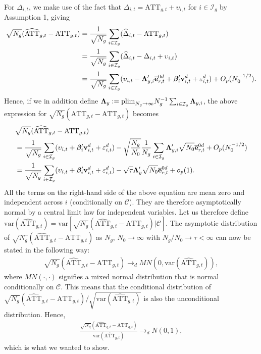 \documentclass[12pt,fleqn]{article}
\begin{document}
For $\Delta_{i,t}$, we make use of the fact that $\Delta_{i,t}= \mathrm{ATT}_{g,t} + \upsilon_{i,t}$ for $i\in \mathcal{I}_g$ by Assumption 1, giving
\begin{align}
 \sqrt{N_g}(\widehat{\mathrm{ATT}}_{g,t} - \mathrm{ATT}_{g,t}) & = \frac{1}{\sqrt{N_g}} \sum_{i\in \mathcal{I}_g} (\widehat \Delta_{i,t} - \mathrm{ATT}_{g,t}) \notag\\
& = \frac{1}{\sqrt{N_g}} \sum_{i\in \mathcal{I}_g} (\widehat \Delta_{i,t} - \Delta_{i,t} + \upsilon_{i,t}) \notag\\
& = \frac{1}{\sqrt{N_g}} \sum_{i\in \mathcal{I}_g} (\upsilon_{i,t} - \boldsymbol{\Lambda}_{y,i}'\overline{\mathbf{e}}_{r,t}^{0d} + \boldsymbol{\beta}_i'\mathbf{v}_{i,t}^d + \varepsilon_{i,t}^d ) + O_p(N_0^{-1/2}) .
\end{align}
Hence, if we in addition define $\boldsymbol{\Lambda}_y := \mathrm{plim}_{N_g\to\infty} N_g^{-1} \sum_{i\in \mathcal{I}_g}\boldsymbol{\Lambda}_{y,i}$, the above expression for $\sqrt{N_g}(\widehat{\mathrm{ATT}}_{g,t} - \mathrm{ATT}_{g,t})$ becomes
\begin{align}
& \sqrt{N_g}(\widehat{\mathrm{ATT}}_{g,t} - \mathrm{ATT}_{g,t}) \notag\\
&= \frac{1}{\sqrt{N_g}}\sum_{i\in \mathcal{I}_g}(\upsilon_{i,t}  + \boldsymbol{\beta}_i'\mathbf{v}_{i,t}^d + \varepsilon_{i,t}^d) - \sqrt{\frac{N_g}{N_0}} \frac{1}{N_g}\sum_{i\in \mathcal{I}_g} \boldsymbol{\Lambda}_{y,i}'\sqrt{N_0}\overline{\mathbf{e}}_{r,t}^{0d} + O_p(N_0^{-1/2}) \notag\\
&= \frac{1}{\sqrt{N_g}}\sum_{i\in \mathcal{I}_g} (\upsilon_{i,t}  + \boldsymbol{\beta}_i'\mathbf{v}_{i,t}^d + \varepsilon_{i,t}^d ) - \sqrt{\tau}\boldsymbol{\Lambda}_y'\sqrt{N_0}\overline{\mathbf{e}}_{r,t}^{0d} + o_p(1).
\end{align}
All the terms on the right-hand side of the above equation are mean zero and independent across $i$ (conditionally on $\mathcal{C}$). They are therefore asymptotically normal by a central limit law for independent variables. Let us therefore define $\mathrm{var}(\widehat{\mathrm{ATT}}_{g,t}) = \mathrm{var}[\sqrt{N_g}(\widehat{\mathrm{ATT}}_{g,t} - \mathrm{ATT}_{g,t})  |\mathcal{C}]$. The asymptotic distribution of $\sqrt{N_g}(\widehat{\mathrm{ATT}}_{g,t} - \mathrm{ATT}_{g,t})$ as $N_g,\,N_0\to\infty$ with $N_g/N_0 \to \tau < \infty$ can now be stated in the following way:
\begin{align}
\sqrt{N_g}(\widehat{\mathrm{ATT}}_{g,t} - \mathrm{ATT}_{g,t}) \to_d MN(0, \mathrm{var}(\widehat{\mathrm{ATT}}_{g,t}) ),
\end{align}
where $MN(\cdot,\cdot)$ signifies a mixed normal distribution that is normal conditionally on $\mathcal{C}$. This means that the conditional distribution of $\sqrt{N_g}(\widehat{\mathrm{ATT}}_{g,t} - \mathrm{ATT}_{g,t})/\sqrt{\mathrm{var}(\widehat{\mathrm{ATT}}_{g,t})}$ is also the unconditional distribution. Hence,
\begin{align}
\frac{\sqrt{N_g}(\widehat{\mathrm{ATT}}_{g,t} - \mathrm{ATT}_{g,t})}{\mathrm{var}(\widehat{\mathrm{ATT}}_{g,t})} \to_d N(0, 1),
\end{align}
which is what we wanted to show.
\end{document}
